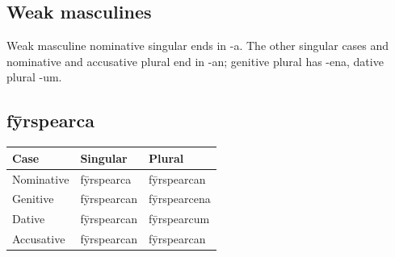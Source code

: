 \subsection*{Weak masculines}

Weak masculine nominative singular ends in -a. The other singular cases and nominative and accusative plural end in -an; genitive plural has -ena, dative plural -um.

\subsection*{fȳrspearca}

\par\begingroup
\fontsize{10.5}{13.2}\selectfont
\setlength{\LTleft}{0pt}\setlength{\LTright}{\fill}
\noindent
\begin{tabular}{@{}>{\raggedright\arraybackslash}p{35.87mm}>{\raggedright\arraybackslash}p{39.46mm}>{\raggedright\arraybackslash}p{43.05mm}@{}}
\toprule
\textbf{Case} & \textbf{Singular} & \textbf{Plural} \\
\midrule
Nominative & fȳrspearca & fȳrspearcan \\
Genitive & fȳrspearcan & fȳrspearcena \\
Dative & fȳrspearcan & fȳrspearcum \\
Accusative & fȳrspearcan & fȳrspearcan \\
\bottomrule
\end{tabular}
\par\endgroup

